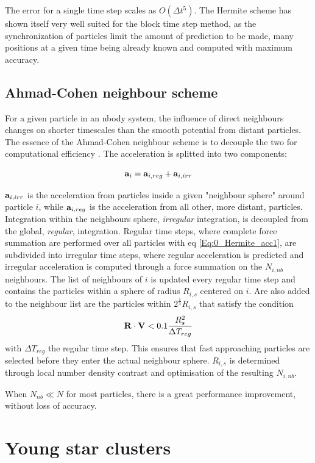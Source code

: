 The error for a single time step scales as $O(\Delta t^5)$. The Hermite scheme has shown itself very well suited for the block time step method, as the synchronization of particles limit the amount of prediction to be made, many positions at a given time being already known and computed with maximum accuracy.


\subsection{Ahmad-Cohen neighbour scheme}

For a given particle in an nbody system, the influence of direct neighbours changes on shorter timescales than the smooth potential from distant particles. The essence of the Ahmad-Cohen neighbour scheme is to decouple the two for computational efficiency \citep{AhmadCohen1973}. The acceleration is splitted into two components:

\begin{equation}
\bold{a}_i = \bold{a}_{i,reg} + \bold{a}_{i,irr}
\end{equation}

$\bold{a}_{i,irr}$ is the acceleration from particles inside a given "neighbour sphere" around particle $i$, while $\bold{a}_{i,reg}$ is the acceleration from all other, more distant, particles. Integration within the neighbours sphere,  \textit{irregular} integration, is decoupled from the global, \textit{regular}, integration. Regular time steps, where complete force summation are performed over all particles with eq \ref{Eq:0_Hermite_acc1}, are subdivided into irregular time steps, where regular acceleration is predicted and irregular acceleration is computed through a force summation on the $N_{i,nb}$ neighbours. The list of neighbours of $i$ is updated every regular time step and contains the particles within a sphere of radius $R_{i,s}$ centered on $i$. Are also added to the neighbour list are the particles within $2^{\frac{1}{3}}R_{i,s} $ that satisfy the condition
\begin{equation}
\bold{R} \cdot \bold{V} < 0.1 \frac{R_s^2}{\Delta T_{reg}}
\end{equation}
with $\Delta T_{reg}$ the regular time step. This ensures that fast approaching particles are selected before they enter the actual neighbour sphere. $R_{i,s}$ is determined through local number density contrast and optimisation of the resulting $N_{i,nb}$. 

When $N_{nb} \ll N$ for most particles, there is a great performance improvement, without loss of accuracy. 



\newpage
 \section{Young star clusters}











